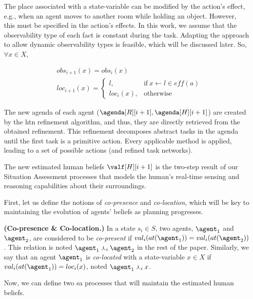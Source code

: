 The place associated with a state-variable can be modified by the action's effect, e.g., when an agent moves to another room while holding an object. However, this must be specified in the action's effects. 
In this work, we assume that the observability type of each fact is constant during the task. Adapting the approach to allow dynamic observability types is feasible, which will be discussed later.
So, $\forall x \in X$,

\begin{align} \label{eq:obs_update}
    &obs_{i+1}(x) = obs_i(x) \\
    &loc_{i+1}(x) = \left\{ 
    \begin{array}{ll}
        l, & \mbox{if} ~ x \leftarrow l \in \textit{eff}(a)\\
        loc_i(x), & \mbox{otherwise}
    \end{array}\right.
\end{align}

The new agenda of each agent ($\agenda[R][i+1], \agenda[H][i+1]$) are created by the \acrshort{htn} refinement algorithm, and thus, they are directly retrieved from the obtained refinement. 
This refinement decomposes abstract tasks in the agenda until the first task is a primitive action. Every applicable method is applied, leading to a set of possible actions (and refined task networks).

The new estimated human beliefs $\valf[H][i+1]$ is the two-step result of our Situation Assessment processes that models the human's real-time sensing and reasoning capabilities about their surroundings.

First, let us define the notions of \textit{co-presence} and \textit{co-location}, which will be key to maintaining the evolution of agents' beliefs as planning progresses.

\begin{definition} \label{def:co-pre-loc}
    \textbf{(Co-presence \& Co-location.)} In a state $s_i \in S$, two agents, $\agent_1$ and $\agent_2$, are considered to be \textit{co-present} if $val_i(at(\agent_1)) = val_i(at(\agent_2))$. This relation is noted $\agent_1 \curlywedge_i \agent_2$ in the rest of the paper. Similarly, we say that an agent $\agent_1$ is \textit{co-located} with a state-variable $x \in X$ if $val_i(at(\agent_1)) = loc_i(x)$, noted $\agent_1 \curlywedge_i x$.
\end{definition}

Now, we can define two \acrfull{sa} processes that will maintain the estimated human beliefs.

